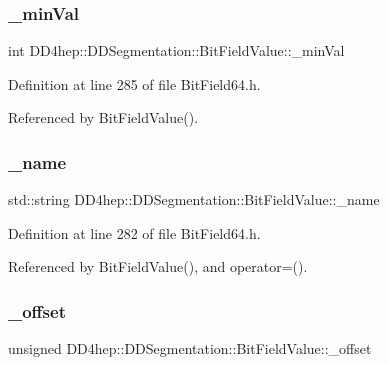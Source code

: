 \subsubsection{\texorpdfstring{\+\_\+min\+Val}{\_minVal}}
{\footnotesize\ttfamily int D\+D4hep\+::\+D\+D\+Segmentation\+::\+Bit\+Field\+Value\+::\+\_\+min\+Val\hspace{0.3cm}{\ttfamily [protected]}}



Definition at line 285 of file Bit\+Field64.\+h.



Referenced by Bit\+Field\+Value().

\hypertarget{class_d_d4hep_1_1_d_d_segmentation_1_1_bit_field_value_a0fe0475b6dcbe318bcba73096a20eb2f}{}\label{class_d_d4hep_1_1_d_d_segmentation_1_1_bit_field_value_a0fe0475b6dcbe318bcba73096a20eb2f} 
\subsubsection{\texorpdfstring{\+\_\+name}{\_name}}
{\footnotesize\ttfamily std\+::string D\+D4hep\+::\+D\+D\+Segmentation\+::\+Bit\+Field\+Value\+::\+\_\+name\hspace{0.3cm}{\ttfamily [protected]}}



Definition at line 282 of file Bit\+Field64.\+h.



Referenced by Bit\+Field\+Value(), and operator=().

\hypertarget{class_d_d4hep_1_1_d_d_segmentation_1_1_bit_field_value_aaec5eef97c6b194e309a3467fedb391c}{}\label{class_d_d4hep_1_1_d_d_segmentation_1_1_bit_field_value_aaec5eef97c6b194e309a3467fedb391c} 
\subsubsection{\texorpdfstring{\+\_\+offset}{\_offset}}
{\footnotesize\ttfamily unsigned D\+D4hep\+::\+D\+D\+Segmentation\+::\+Bit\+Field\+Value\+::\+\_\+offset\hspace{0.3cm}{\ttfamily [protected]}}



